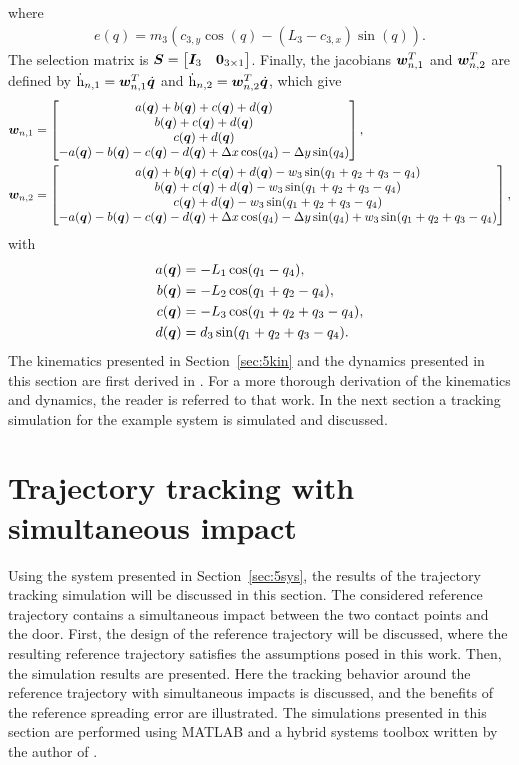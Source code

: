 \documentclass[../DC2019003Bouma.tex]{subfiles}
\begin{document}
where
\begin{align*}
e(q) = m_3\left(c_{3,y}\cos(q) - (L_3-c_{3,x})\sin(q)\right).
\end{align*}
The selection matrix is ${\boldsymbol{S}} = \begin{bmatrix}{\boldsymbol{I}}_3 & {\boldsymbol{0}}_{3 \times 1}\end{bmatrix}$. Finally, the jacobians ${\boldsymbol{w}}_{n,1}^T$ and ${\boldsymbol{w}}_{n,2}^T$ are defined by $\dot{\mathrm{h}}_{n,1} = {\boldsymbol{w}}_{n,1}^T \dot{{\boldsymbol{q}}}$ and $\dot{\mathrm{h}}_{n,2} = {\boldsymbol{w}}_{n,2}^T \dot{{\boldsymbol{q}}}$, which give
\begin{align}
{\boldsymbol{w}}_{n,1} &= \begin{bmatrix}
a({\boldsymbol{q}}) + b({\boldsymbol{q}}) + c({\boldsymbol{q}}) + d({\boldsymbol{q}})\\
b({\boldsymbol{q}}) + c({\boldsymbol{q}}) + d({\boldsymbol{q}})\\
c({\boldsymbol{q}}) + d({\boldsymbol{q}})\\
-a({\boldsymbol{q}}) - b({\boldsymbol{q}}) - c({\boldsymbol{q}}) - d({\boldsymbol{q}}) + \Delta x\cos(q_4) - \Delta y\sin(q_4)
\end{bmatrix},\\
{\boldsymbol{w}}_{n,2} &= \begin{bmatrix}
a({\boldsymbol{q}}) + b({\boldsymbol{q}}) + c({\boldsymbol{q}}) + d({\boldsymbol{q}})-w_3\sin(q_1+q_2+q_3-q_4)\\
b({\boldsymbol{q}}) + c({\boldsymbol{q}}) + d({\boldsymbol{q}})-w_3\sin(q_1+q_2+q_3-q_4)\\
c({\boldsymbol{q}}) + d({\boldsymbol{q}})-w_3\sin(q_1+q_2+q_3-q_4)\\
-a({\boldsymbol{q}}) - b({\boldsymbol{q}}) - c({\boldsymbol{q}}) - d({\boldsymbol{q}}) + \Delta x\cos(q_4) - \Delta y\sin(q_4)+w_3\sin(q_1+q_2+q_3-q_4)
\end{bmatrix},
\end{align}
with
\begin{align*}
a({\boldsymbol{q}}) &= -L_1\cos(q_1-q_4),\\
b({\boldsymbol{q}}) &= -L_2\cos(q_1+q_2-q_4),\\
c({\boldsymbol{q}}) &= -L_3\cos(q_1+q_2+q_3-q_4),\\
d({\boldsymbol{q}}) &= d_3\sin(q_1+q_2+q_3-q_4).
\end{align*}
The kinematics presented in Section~\ref{sec:5kin} and the dynamics presented in this section are first derived in \cite{Rijnen2018b}. For a more thorough derivation of the kinematics and dynamics, the reader is referred to that work. In the next section a tracking simulation for the example system is simulated and discussed. 
\section{Trajectory tracking with simultaneous impact}\label{sec:5track}
Using the system presented in Section~\ref{sec:5sys}, the results of the trajectory tracking simulation will be discussed in this section. The considered reference trajectory contains a simultaneous impact between the two contact points and the door. First, the design of the reference trajectory will be discussed, where the resulting reference trajectory satisfies the assumptions posed in this work. Then, the simulation results are presented. Here the tracking behavior around the reference trajectory with simultaneous impacts is discussed, and the benefits of the reference spreading error are illustrated. The simulations presented in this section are performed using MATLAB and a hybrid systems toolbox written by the author of \cite{Rijnen2018a}.
\end{document}
